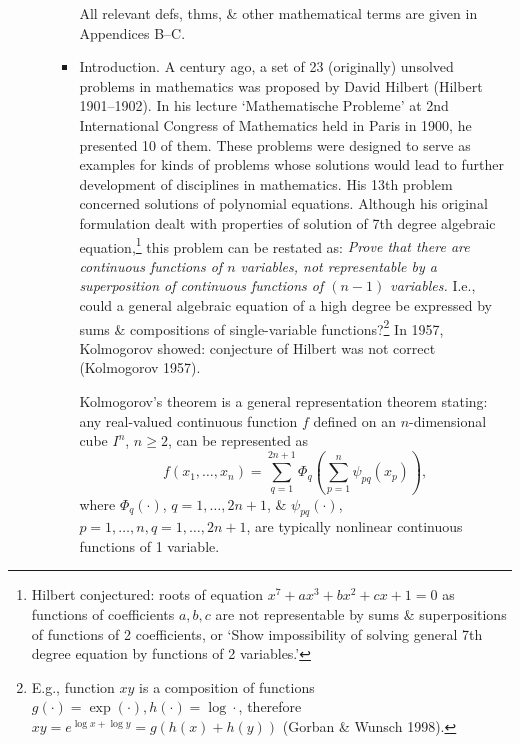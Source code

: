 \documentclass{article}
\begin{document}
\begin{enumerate}
\begin{itemize}
\begin{itemize}
			All relevant defs, thms, \& other mathematical terms are given in Appendices B--C.
			\item {\sf Introduction.} A century ago, a set of 23 (originally) unsolved problems in mathematics was proposed by {\sc David Hilbert} (Hilbert 1901--1902). In his lecture `Mathematische Probleme' at 2nd International Congress of Mathematics held in Paris in 1900, he presented 10 of them. These problems were designed to serve as examples for kinds of problems whose solutions would lead to further development of disciplines in mathematics. His 13th problem concerned solutions of polynomial equations. Although his original formulation dealt with properties of solution of 7th degree algebraic equation,\footnote{{\sc Hilbert} conjectured: roots of equation $x^7 + ax^3 + bx^2 + cx + 1 = 0$ as functions of coefficients $a,b,c$ are not representable by sums \& superpositions of functions of 2 coefficients, or `Show impossibility of solving general 7th degree equation by functions of 2 variables.'} this problem can be restated as: {\it Prove that there are continuous functions of $n$ variables, not representable by a superposition of continuous functions of $(n - 1)$ variables.} I.e., could a general algebraic equation of a high degree be expressed by sums \& compositions of single-variable functions?\footnote{E.g., function $xy$ is a composition of functions $g(\cdot)  = \exp(\cdot),h(\cdot) = \log\cdot$, therefore $xy = e^{\log x + \log y} = g(h(x) + h(y))$ (Gorban \& Wunsch 1998).} In 1957, {\sc Kolmogorov} showed: conjecture of {\sc Hilbert} was not correct (Kolmogorov 1957).
			
			{\sf Kolmogorov}'s theorem is a general representation theorem stating: any real-valued continuous function $f$ defined on an $n$-dimensional cube $I^n$, $n\ge2$, can be represented as
			\begin{equation}
				f(x_1,\ldots,x_n) = \sum_{q=1}^{2n + 1} \Phi_q\left(\sum_{p=1}^n \psi_{pq}(x_p)\right),
			\end{equation}
			where $\Phi_q(\cdot)$, $q = 1,\ldots,2n + 1$, \& $\psi_{pq}(\cdot)$, $p = 1,\ldots,n,q = 1,\ldots,2n + 1$, are typically nonlinear continuous functions of 1 variable.
			

\end{itemize}
\end{itemize}
\end{enumerate}
\end{document}
